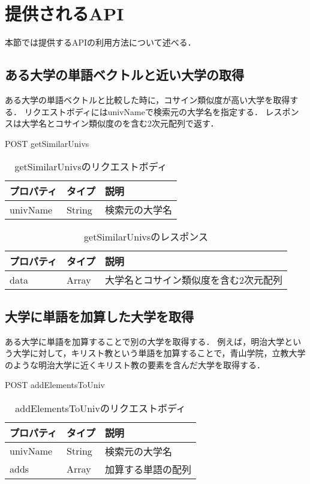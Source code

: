\section{提供されるAPI}
本節では提供するAPIの利用方法について述べる．

\subsection{ある大学の単語ベクトルと近い大学の取得}
ある大学の単語ベクトルと比較した時に，コサイン類似度が高い大学を取得する．
リクエストボディにはunivNameで検索元の大学名を指定する．
レスポンスは大学名とコサイン類似度のを含む2次元配列で返す．

POST getSimilarUnivs

\begin{table}[htbp]
\caption{getSimilarUnivsのリクエストボディ}
\centering
\begin{tabular}{lll}
\hline
プロパティ & タイプ & 説明
\\ \hline \hline
univName & String & 検索元の大学名\\  \hline
\end{tabular}
\end{table}

\begin{table}[htbp]
\caption{getSimilarUnivsのレスポンス}
\centering
\begin{tabular}{lll}
\hline
プロパティ & タイプ & 説明
\\ \hline \hline
data & Array & 大学名とコサイン類似度を含む2次元配列\\  \hline
\end{tabular}
\end{table}

\subsection{大学に単語を加算した大学を取得}
ある大学に単語を加算することで別の大学を取得する．
例えば，明治大学という大学に対して，キリスト教という単語を加算することで，青山学院，立教大学のような明治大学に近くキリスト教の要素を含んだ大学を取得する．

POST addElementsToUniv

\begin{table}[htbp]
\caption{addElementsToUnivのリクエストボディ}
\centering
\begin{tabular}{lll}
\hline
プロパティ & タイプ & 説明
\\ \hline \hline
univName & String & 検索元の大学名\\
adds & Array & 加算する単語の配列\\  \hline
\end{tabular}
\end{table}

